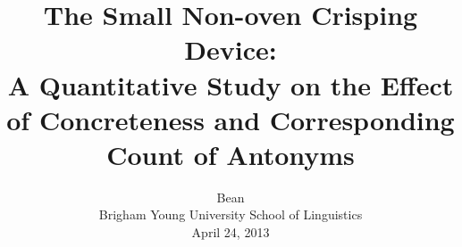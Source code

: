 \title{The Small Non-oven Crisping Device:\\
A Quantitative Study on the Effect of Concreteness and Corresponding Count of Antonyms}

\renewcommand{\today}{April 24, 2013}
\author{Bean\\
Brigham Young University School of Linguistics\\
\today}
\maketitle
